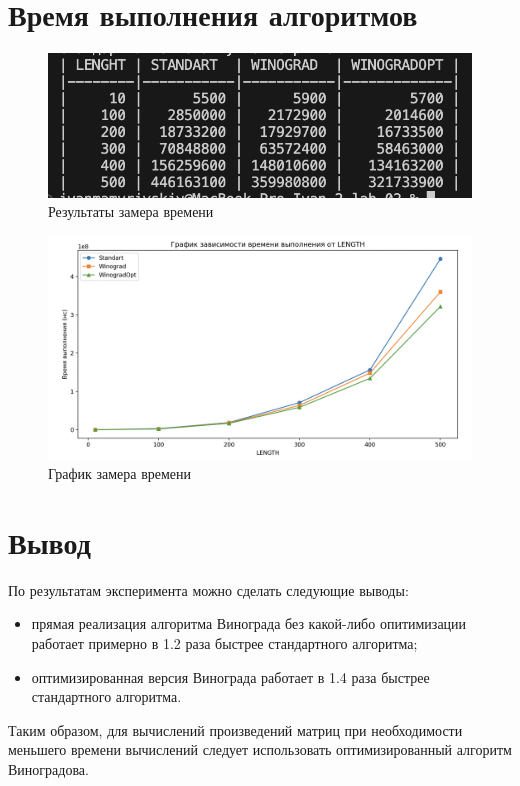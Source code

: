 \section{Время выполнения алгоритмов}

\begin{figure}[h]
	\centering
	\includegraphics[height=0.15\textheight]{img/resTime.jpg}
	\caption{Результаты замера времени}
	\label{img:demonstration}
\end{figure}

\begin{figure}[h]
	\centering
	\includegraphics[height=0.37\textheight]{img/graph.jpg}
	\caption{График замера времени}
	\label{img:demonstration}
\end{figure}

\clearpage
\section{Вывод}

По результатам эксперимента можно сделать следующие выводы:
\begin{itemize}[left=\parindent]
     \item прямая реализация алгоритма Винограда без какой-либо опитимизации
         работает примерно в 1.2 раза быстрее стандартного алгоритма;
     \item оптимизированная версия Винограда работает в 1.4 раза быстрее
         стандартного алгоритма.
\end{itemize}

Таким образом, для вычислений произведений матриц при необходимости меньшего времени вычислений 
следует использовать оптимизированный алгоритм Виноградова.


